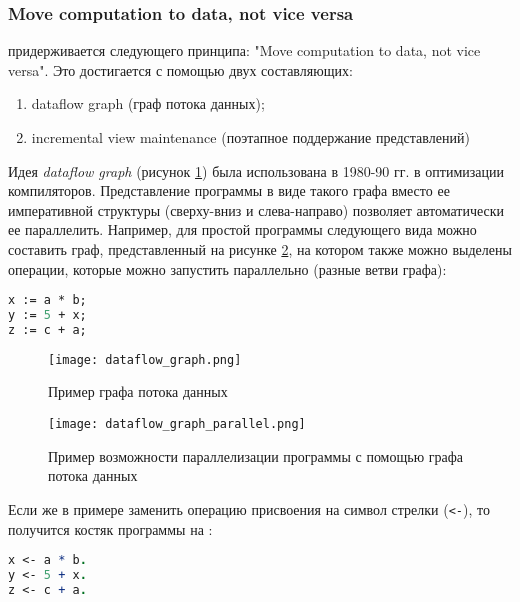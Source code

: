 \subsubsection{Move computation to data, not vice versa}
\label{sec:technology:data_to_computation}

\LB придерживается следующего принципа: "Move com\-pu\-ta\-tion to data, not vice versa". Это достигается с помощью двух составляющих:

\begin{enumerate}
  \item dataflow graph (граф потока данных);
  \item incremental view maintenance (поэтапное поддержание представлений)
\end{enumerate}

Идея \emph{dataflow graph} (рисунок \ref{fig:technology:data_to_computation:dataflow_graph}) была использована в 1980-90 гг. в оптимизации компиляторов. Представление программы в виде такого графа вместо ее императивной структуры (сверху-вниз и слева-направо) позволяет автоматически ее параллелить. Например, для простой программы следующего вида можно составить граф, представленный на рисунке \ref{fig:technology:data_to_computation:dataflow_graph_parallel}, на котором также можно выделены операции, которые можно запустить параллельно (разные ветви графа):

\begin{lstlisting}[language=Pascal]
x := a * b;
y := 5 + x;
z := c + a;
\end{lstlisting}

\begin{figure}
	\centering
	\texttt{[image: dataflow\_graph.png]}
	\caption{Пример графа потока данных}
	\label{fig:technology:data_to_computation:dataflow_graph}
\end{figure}

\begin{figure}
	\centering
	\texttt{[image: dataflow\_graph\_parallel.png]}
	\caption{Пример возможности параллелизации программы с помощью графа потока данных}
	\label{fig:technology:data_to_computation:dataflow_graph_parallel}
\end{figure}

Если же в примере заменить операцию присвоения на символ стрелки (\lstinline{<-}), то получится костяк программы на \logiql:

\begin{lstlisting}[language=Prolog]
x <- a * b.
y <- 5 + x.
z <- c + a.
\end{lstlisting}

